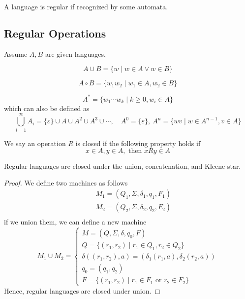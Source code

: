 \begin{definition}
    A language is regular if recognized by some automata.
\end{definition}

\subsection{Regular Operations}

\begin{definition*}
Assume $A, B$ are given languages,
\begin{definition}[Union]
    \[
        A \cup B = \{ w \;|\; w \in A \lor w \in B \}
    \]
\end{definition}
\begin{definition}[Concatenation]
    \[
        A \circ B = \{ w_1w_2 \;|\; w_1 \in A, w_2 \in B \}
    \]
\end{definition}
\begin{definition}
    \[
        A^* = \{ w_1 \cdots w_k \;|\; k \geq 0, w_i \in A \}
    \]
    which can also be defined as
    \[
        \bigcup_{i=1}^\infty A_i = \{\varepsilon\} \cup A \cup A^2 \cup A^3 \cup \cdots, \quad A^0 = \{\varepsilon\}, \ A^n = \{wv \;|\; w \in A^{n-1}, v \in A\}
    \]
\end{definition}
\end{definition*}

\begin{definition}[closed]
    We say an operation $R$ is closed if the following property holds if
    \[
        x \in A, y \in A, \text{ then } xRy \in A
    \]
\end{definition}

\begin{theorem}
    Regular languages are closed under the union, concatenation, and Kleene star.
\end{theorem}
\begin{proof}
We define two machines as follows
\begin{eqnarray*}
    && M_1 =(Q_1, \Sigma, \delta_1, q_1, F_1)\\
    && M_2 =(Q_2, \Sigma, \delta_2, q_2, F_2)\\
\end{eqnarray*}
if we union them, we can define a new machine
\[
M_1 \cup M_2 = \begin{cases}
    M = (Q, \Sigma, \delta, q_0, F) \\
    Q = \{ (r_1, r_2) \;|\; r_1 \in Q_1, r_2 \in Q_2 \}\\
    \delta((r_1, r_2), a) = (\delta_1(r_1, a), \delta_2(r_2, a))\\
    q_0 = (q_1, q_2) \\
    F = \{ (r_1, r_2) \;|\; r_1 \in F_1 \text{ or } r_2 \in F_2 \}
\end{cases}
\]
Hence, regular languages are closed under union.
\end{proof}